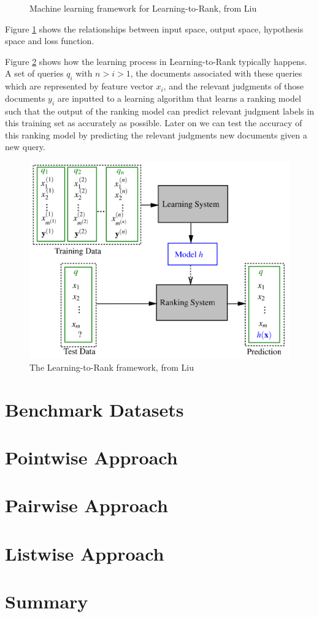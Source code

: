 \begin{description}
{\begin{figure}
\caption{Machine learning framework for Learning-to-Rank, from Liu\cite{Liu2007}}
\label{fig:discriminative_training}
\end{figure}
Figure \ref{fig:discriminative_training} shows the relationships between input space, output space, hypothesis space and loss function.
}

Figure \ref{ref:ltr_framework} shows how the learning process in Learning-to-Rank typically happens. A set of queries $q_i$ with $n > i > 1$, the documents associated with these queries which are represented by feature vector $x_i$, and the relevant judgments of those documents $y_i$ are inputted to a learning algorithm that learns a ranking model such that the output of the ranking model can predict relevant judgment labels in this training set as accurately as possible. Later on we can test the accuracy of this ranking model by predicting the relevant judgments new documents given a new query.
\begin{figure}
\includegraphics[scale=0.3]{gfx/ltr_framework}
\caption{The Learning-to-Rank framework, from Liu\cite{Liu2007}}
\label{ref:ltr_framework}
\end{figure}

\end{description}
\chapter{Benchmark Datasets}
\chapter{Pointwise Approach}
\chapter{Pairwise Approach}
\chapter{Listwise Approach}
\chapter{Summary}